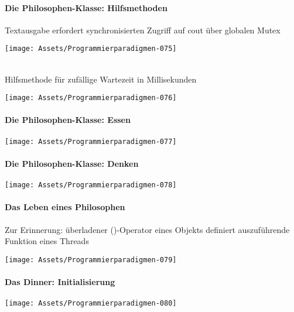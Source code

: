 \documentclass[10pt]{article}
\begin{document}
\paragraph{Die Philosophen-Klasse: Hilfsmethoden}
Textausgabe erfordert synchronisierten Zugriff auf cout über globalen Mutex
\begin{center}
  \texttt{[image: Assets/Programmierparadigmen-075]}
\end{center} \ \\
Hilfsmethode für zufällige Wartezeit in Millisekunden
\begin{center}
  \texttt{[image: Assets/Programmierparadigmen-076]}
\end{center}

\paragraph{Die Philosophen-Klasse: Essen}
\begin{center}
  \texttt{[image: Assets/Programmierparadigmen-077]}
\end{center}

\paragraph{Die Philosophen-Klasse: Denken}
\begin{center}
  \texttt{[image: Assets/Programmierparadigmen-078]}
\end{center}

\paragraph{Das Leben eines Philosophen}
\begin{itemize*}
  \item Zur Erinnerung: überladener ()-Operator eines Objekts definiert auszuführende Funktion eines Threads
\end{itemize*}
\begin{center}
  \texttt{[image: Assets/Programmierparadigmen-079]}
\end{center}

\paragraph{Das Dinner: Initialisierung}
\begin{center}
  \texttt{[image: Assets/Programmierparadigmen-080]}
\end{center}
\end{document}
